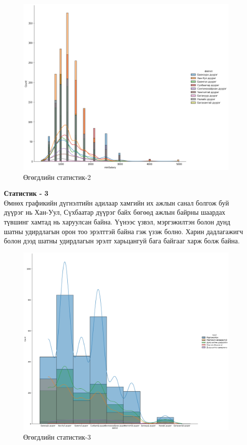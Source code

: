\begin{figure}[ht]
  \centering
  \includegraphics[width=\textwidth]{graphics/3.png}
  \caption{Өгөгдлийн статистик-2}\label{fig:statistics2}
\end{figure}
\newpage
\textbf{Статистик - 3}
\\Өмнөх графикийн дүгнэлтийн адилаар хамгийн их ажлын санал болгож буй дүүрэг нь Хан-Уул, Сүхбаатар дүүрэг байх бөгөөд ажлын байрны шаардах түвшинг хамтад нь харуулсан байна. Үүнээс үзвэл, мэргэжилтэн болон дунд шатны удирдлагын орон тоо эрэлттэй байна гэж үзэж болно. Харин дадлагажигч болон дээд шатны удирдлагын эрэлт харьцангуй бага байгааг харж болж байна.
\begin{figure}[ht]
  \centering
  \includegraphics[width=\textwidth]{graphics/4.png}
  \caption{Өгөгдлийн статистик-3}\label{fig:statistics3}
\end{figure}
